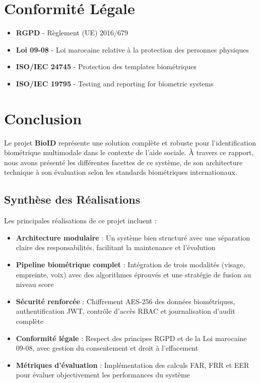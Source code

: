 \documentclass[12pt,a4paper]{report}
\begin{document}
\chapter{Conformité Légale}

\begin{itemize}
    \item \textbf{RGPD} - Règlement (UE) 2016/679
    \item \textbf{Loi 09-08} - Loi marocaine relative à la protection des personnes physiques
    \item \textbf{ISO/IEC 24745} - Protection des templates biométriques
    \item \textbf{ISO/IEC 19795} - Testing and reporting for biometric systems
\end{itemize}

\chapter*{Conclusion}

Le projet \textbf{BioID} représente une solution complète et robuste pour l'identification biométrique multimodale dans le contexte de l'aide sociale. À travers ce rapport, nous avons présenté les différentes facettes de ce système, de son architecture technique à son évaluation selon les standards biométriques internationaux.

\section*{Synthèse des Réalisations}

Les principales réalisations de ce projet incluent :

\begin{itemize}
    \item \textbf{Architecture modulaire} : Un système bien structuré avec une séparation claire des responsabilités, facilitant la maintenance et l'évolution
    
    \item \textbf{Pipeline biométrique complet} : Intégration de trois modalités (visage, empreinte, voix) avec des algorithmes éprouvés et une stratégie de fusion au niveau score
    
    \item \textbf{Sécurité renforcée} : Chiffrement AES-256 des données biométriques, authentification JWT, contrôle d'accès RBAC et journalisation d'audit complète
    
    \item \textbf{Conformité légale} : Respect des principes RGPD et de la Loi marocaine 09-08, avec gestion du consentement et droit à l'effacement
    
    \item \textbf{Métriques d'évaluation} : Implémentation des calculs FAR, FRR et EER pour évaluer objectivement les performances du système
\end{itemize}
\end{document}
